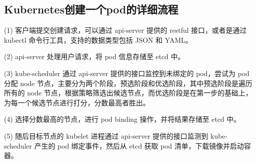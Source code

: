 \documentclass[../../../interview-questions.tex]{subfiles}
\begin{document}
\subsection{Kubernetes创建一个pod的详细流程}

(1) 客户端提交创建请求，可以通过 api-server 提供的 restful 接口，或者是通过 kubectl 命令行工具，支持的数据类型包括 JSON 和 YAML。

(2) api-server 处理用户请求，将 pod 信息存储至 etcd 中。

(3) kube-scheduler 通过 api-server 提供的接口监控到未绑定的 pod，尝试为 pod 分配 node 节点，主要分为两个阶段，预选阶段和优选阶段，其中预选阶段是遍历所有的 node 节点，根据策略筛选出候选节点，而优选阶段是在第一步的基础上，为每一个候选节点进行打分，分数最高者胜出。

(4) 选择分数最高的节点，进行 pod binding 操作，并将结果存储至 etcd 中。

(5) 随后目标节点的 kubelet 进程通过 api-server 提供的接口监测到 kube-scheduler 产生的 pod 绑定事件，然后从 etcd 获取 pod 清单，下载镜像并启动容器。
\end{document}

